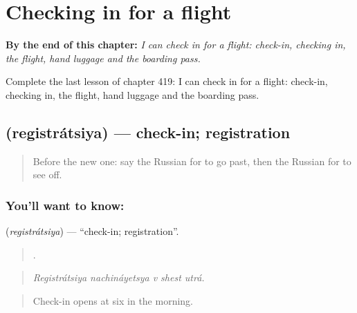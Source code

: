 
\chapter{Checking in for a flight}
\label{ch:ru-checking-in-for-a-flight}

\begin{chapteropening}
\textbf{By the end of this chapter:} \emph{I can check in for a flight: check-in, checking in, the flight, hand luggage and the boarding pass.}

Complete the last lesson of chapter 419: I can check in for a flight: check-in, checking in, the flight, hand luggage and the boarding pass.
\end{chapteropening}

\section[\texorpdfstring{\ru{регистрация} (registrátsiya)}{регистрация (registrátsiya)}]{ (registrátsiya) — check-in; registration}

\label{lesson:RU-C419-registratsiya}



\begin{quote}
Before the new one: say the Russian for to go past, then the Russian for to see off.
\end{quote}

\subsection*{You'll want to know: }
\textbf{} (\emph{registrátsiya}) — \textquotedblleft{}check-in; registration\textquotedblright{}.

\begin{quote}
    .
\end{quote}

\begin{quote}
\emph{Registrátsiya nachináyetsya v shest utrá.}
\end{quote}

\begin{quote}
Check-in opens at six in the morning.
\end{quote}

